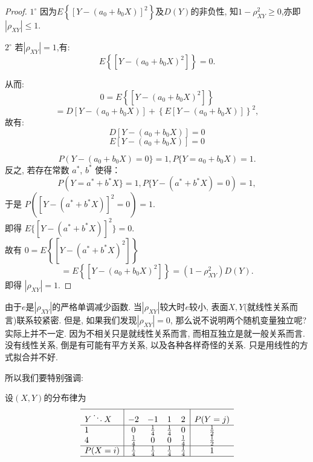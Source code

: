 \begin{proof}
    \qquad $1^{\circ}$ 因为$E\left\{\left[Y-\left(a_0 + b_0X\right)\right]^2\right\}$及$D\left(Y\right)$的非负性, 
     知$1-\rho_{X Y}^2 \geq 0$,亦即$\left| \rho_{X Y} \right| \leq 1.$

     
    \qquad $2^{\circ}$ 若$\left|\rho_{X Y}\right| = 1$,有:
    $$
       E\left\{\left[Y - (a_0 + b_0X)^2\right]\right\} = 0.
    $$
    
    从而:
    $$
        0 =E\left\{\left[Y - (a_0 + b_0X)^2\right]\right\} 
    $$
    $$
        = D\left[Y - (a_0+b_0X)\right] + \left\{E\left[Y - \left(a_0+b_0X\right)\right]\right\}^2,
   $$
    故有:
    $$
     D\left[Y - (a_0+b_0X)\right] = 0
    $$
    $$
    E\left[Y - \left(a_0+b_0X\right)\right] = 0
    $$

    \[P(Y - (a_0 + b_0X) = 0\} = 1, P\{Y = a_0 + b_0X) = 1.\]
        反之, 若存在常数 $a^*$, $b^*$ 使得：
        \[P(Y = a^* + b^*X\} = 1, P\{Y - (a^* + b^*X) = 0) = 1,\]
        于是 \qquad $P([Y - (a^* + b^*X)]^2 = 0) = 1.$\\
        即得 \qquad $E\{[Y - (a^* + b^*X)]^2\} = 0.$\\
        故有 \qquad $0 =E\left\{\left[Y - (a^* + b^*X)^2\right]\right\}$
        \[
             =E\left\{\left[Y - (a_0 + b_0X)^2\right]\right\} =\left(1-\rho_{X Y}^2\right) D(Y)  .
        \]
        即得 \qquad $\left|\rho_{X Y}\right| = 1.$
\end{proof}

由于$e$是$\left|\rho_{X Y}\right|$的严格单调减少函数. 当$\left|\rho_{X Y}\right|$较大时$e$较小, 表面$X,Y$(就线性关系而言)联系较紧密. 但是, 如果我们发现$|\rho_{XY}|=0$, 那么说不说明两个随机变量独立呢? 实际上并不一定. 因为不相关只是就线性关系而言, 而相互独立是就一般关系而言. 没有线性关系, 倒是有可能有平方关系, 以及各种各样奇怪的关系. 只是用线性的方式拟合并不好. 

所以我们要特别强调: 

\begin{center}
\end{center}

\begin{example}
    设$(X,Y)$的分布律为
         $$
                \begin{array}{l|cccc|c}
                    \hline Y \ddots X         & -2            & -1            & 1            & 2            & P(Y=j)     \\
                    \hline 1        &0  & \frac{1}{4}            & \frac{1}{4}            & 0            & \frac{1}{2} \\
                    4               & \frac{1}{4}            & 0 & 0 & \frac{1}{4} & \frac{1}{2} \\
                    \hline P(X=i) & \frac{1}{4} & \frac{1}{4} & \frac{1}{4} & \frac{1}{4} & 1            \\
                    \hline
                \end{array}
            $$
\end{example}

